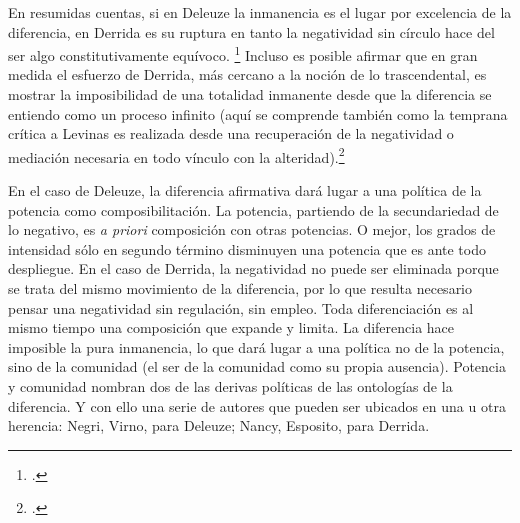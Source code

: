 En resumidas cuentas, si en Deleuze la inmanencia es el lugar por excelencia de la diferencia, en Derrida es su ruptura en tanto la negatividad sin círculo hace del ser algo constitutivamente equívoco. \footcites[Nancy señala que la distancia podría encontrarse entre las formulas: \enquote{diferir consigo mismo} y \enquote{sí mismo difiriéndose}, de Deleuze y Derrida respectivamente. En el primer caso es el ser univoco que se dice de las diferencias, en el segundo caso, el ser nunca puede decirse como tal puesto que siempre difiere, no se hace presente. Si en un caso el sentido se produce en la diferencia, en el otro el sentido se vuelve imposible: \enquote{(\dots) por un lado, el sentido se apoya en la autoridad de la diferenciación, por el otro, el sentido se anula en ella. Uno hace caer todo el peso sobre el sentido como movimiento, como producción, como novedad, como devenir, el otro hace caer un peso equivalente sobre el sentido como idealidad, como identidad localizable, como verdad presentable}.][256]{@6986-NANCY2008}[Es la distinción entre la producción de lo nuevo y una suplencia de lo antiguo siempre perdido. Al mismo tiempo, Giorgio Agamben, en un texto que trabaja la inmanencia deleuzeana, establece esta oposición entre Levinas/Derrida del lado de lo trascendental y Deleuze Foucault del lado de la inmanencia.][]{@6987-AGAMBEN2008} Incluso es posible afirmar que en gran medida el esfuerzo de Derrida, más cercano a la noción de lo trascendental, es mostrar la imposibilidad de una totalidad inmanente desde que la diferencia se entiendo como un proceso infinito (aquí se comprende también como la temprana crítica a Levinas es realizada desde una recuperación de la negatividad o mediación necesaria en todo vínculo con la alteridad).\footcite{@6989-DERRIDA1989}

En el caso de Deleuze, la diferencia afirmativa dará lugar a una política de la potencia como composibilitación. La potencia, partiendo de la secundariedad de lo negativo, es \emph{a priori} composición con otras potencias. O mejor, los grados de intensidad sólo en segundo término disminuyen una potencia que es ante todo despliegue. En el caso de Derrida, la negatividad no puede ser eliminada porque se trata del mismo movimiento de la diferencia, por lo que resulta necesario pensar una negatividad sin regulación, sin empleo. Toda diferenciación es al mismo tiempo una composición que expande y limita. La diferencia hace imposible la pura inmanencia, lo que dará lugar a una política no de la potencia, sino de la comunidad (el ser de la comunidad como su propia ausencia). Potencia y comunidad nombran dos de las derivas políticas de las ontologías de la diferencia. Y con ello una serie de autores que pueden ser ubicados en una u otra herencia: Negri, Virno, para Deleuze; Nancy, Esposito, para Derrida.

